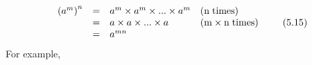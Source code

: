         \label{m38359*uid35}\nopagebreak\noindent{}
    \begin{equation}
    \begin{array}{cccc}\hfill {\left({a}^{m}\right)}^{n}& =& {a}^{m}\ensuremath{\times}{a}^{m}\ensuremath{\times}...\ensuremath{\times}{a}^{m}\hfill & \left(\mathrm{n\; times}\right)\hfill \\ \hfill & =& a\ensuremath{\times}a\ensuremath{\times}...\ensuremath{\times}a\hfill & \left(\mathrm{m}\ensuremath{\times}\mathrm{n\; times}\right)\hfill \\ \hfill & =& {a}^{mn}\hfill & \end{array}\tag{5.15}
      \end{equation}
        \label{m38359*id66694}For example,\par 
        \label{m38359*id66697}\nopagebreak\noindent{}
          
